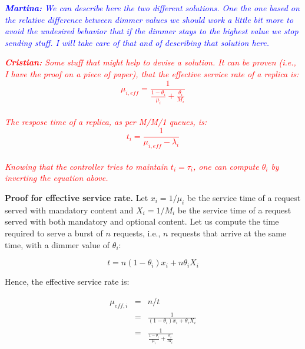 \textcolor{blue}{\textit{\textbf{Martina:} We can describe here the
    two different solutions. One the one based on the relative
    difference between dimmer values we should work a little bit more
    to avoid the undesired behavior that if the dimmer stays to the
    highest value we stop sending stuff. I will take care of that and
    of describing that solution here.}}

\textcolor{red}{\textit{\textbf{Cristian:} Some stuff that might help
    to devise a solution. It can be proven (i.e., I have the proof on
    a piece of paper), that the effective service rate of a replica
    is: $$\mu_{i,eff}=\frac{1}{\frac{1-\theta_i}{\mu_i}+\frac{\theta_i}{M_i}}$$
    \\
    The respose time of a replica, as per M/M/1 queues, is:
    \\
    $$t_i=\frac{1}{\mu_{i,eff}-\lambda_i}$$
    \\
    Knowing that the controller tries to maintain $t_i=\tau_i$, one
    can compute $\theta_i$ by inverting the equation above.
}}
	
\textbf{Proof for effective service rate.} Let $x_i = 1/\mu_i$ be the service time of a request served with mandatory content and $X_i = 1/M_i$ be the service time of a request served with both mandatory and optional content. Let us compute the time required to serve a burst of $n$ requests, i.e., $n$ requests that arrive at the same time, with a dimmer value of $\theta_i$:

$$t=n (1-\theta_i) x_i + n \theta_i X_i$$

Hence, the effective service rate is:

\begin{eqnarray*}
\mu_{eff,i} & = & n/t \\
& = & \frac{1}{(1-\theta_i) x_i + \theta_i X_i} \\
& = & \frac{1}{\frac{1-\theta_i}{\mu_i} + \frac{\theta_i}{M_i}}
\end{eqnarray*}

